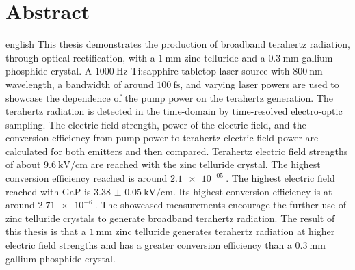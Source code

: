 \thispagestyle{plain}

\section*{Abstract}
\begin{foreignlanguage}{english}
This thesis demonstrates the production of broadband terahertz radiation, through optical rectification, with a $\SI{1}{\milli\meter}$ zinc telluride and a $\SI{0.3}{\milli\meter}$ gallium phosphide crystal.
A $\SI{1000}{\hertz}$ Ti:sapphire tabletop laser source with $\SI{800}{\nano\meter}$ wavelength, a bandwidth of around $\SI{100}{\femto\second}$, and varying laser powers are used to showcase the dependence of the pump power on the terahertz generation.
The terahertz radiation is detected in the time-domain by time-resolved electro-optic sampling.
The electric field strength, power of the electric field, and the conversion efficiency from pump power to terahertz electric field power are calculated for both emitters and then compared.
Terahertz electric field strengths of about $\SI{9.6}{\kilo\V\per\centi\meter}$ are reached with the zinc telluride crystal.
The highest conversion efficiency reached is around $\SI{2.1e-05}{}$.
The highest electric field reached with GaP is $\SI{3.38(5)}{\kilo\V\per\centi\meter}$.
Its highest conversion efficiency is at around $\SI{2.71e-6}{}$.
The showcased measurements encourage the further use of zinc telluride crystals to generate broadband terahertz radiation.
The result of this thesis is that a $\SI{1}{\milli\meter}$ zinc telluride generates terahertz radiation at higher electric field strengths and has a greater conversion efficiency than a $\SI{0.3}{\milli\meter}$ gallium phosphide crystal. 
\end{foreignlanguage}
